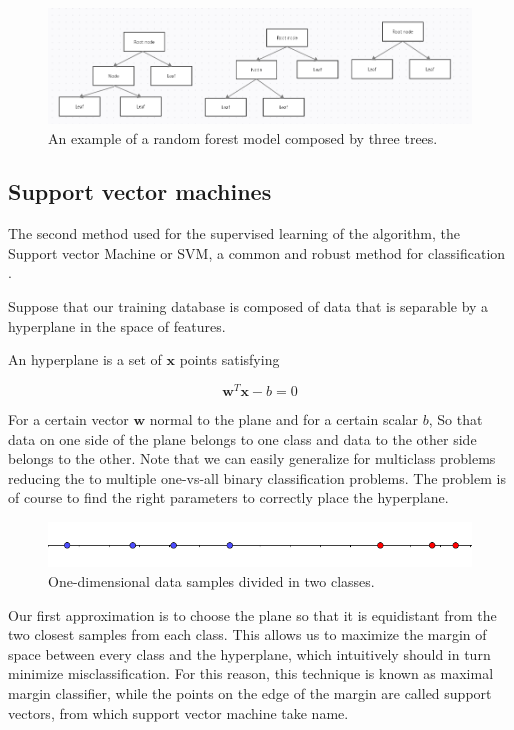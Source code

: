 \documentclass[a4paper]{report}
\begin{document}
\begin{figure} [H]
\centering
\includegraphics [width=\textwidth ] {o/forest.png}
\caption{An example of a random forest model composed by three trees.}
\label{forest}
\end{figure}



\subsection{Support vector machines}

The second method used for the supervised learning of the algorithm, the Support vector Machine or SVM, a common and robust method for classification
\cite{gunn1998support}.

Suppose that our training database is composed of data that is separable by a hyperplane in the space of features.

An hyperplane is a set of $\textbf{x}$ points satisfying

\begin{equation}
    \textbf{w}^T\textbf{x} -b = 0
\end{equation}

For a certain vector $\textbf{w}$ normal to the plane and for a certain scalar $b$, So that data on one side of the plane belongs to one class and data to the other side belongs to the other.
Note that we can easily generalize for multiclass problems reducing the to multiple one-vs-all binary classification problems.
The problem is of course to find the right parameters to correctly place the hyperplane.

\begin{figure} [H]
    \centering
    \includegraphics [width=\textwidth ]{svm/1dim.png}
    \caption{One-dimensional data samples divided in two classes.}
    \label{1dim}
\end{figure}


Our first approximation is to choose the plane so that it is equidistant from the two closest samples from each class.
This allows us to maximize the margin of space between every class and the hyperplane, which intuitively should in turn minimize misclassification.
For this reason, this technique is known as maximal margin classifier, while the points on the edge of the margin are called support vectors, from which support vector machine take name.
\end{document}
